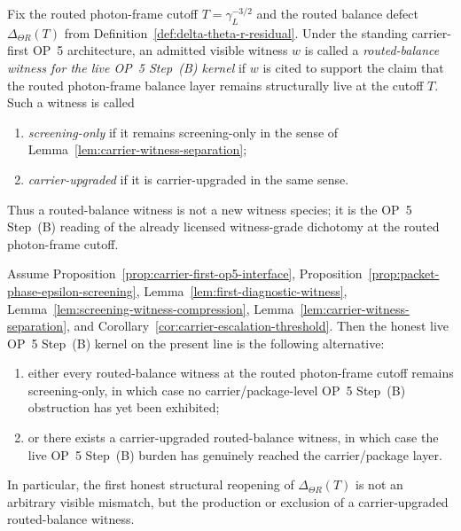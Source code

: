\begin{definition}
\label{def:routed-balance-witness-live-op5b-kernel}
Fix the routed photon-frame cutoff \(T=\gamma_L^{-3/2}\) and the routed balance defect \(\Delta_{\Theta R}(T)\) from Definition~\ref{def:delta-theta-r-residual}. Under the standing carrier-first OP~5 architecture, an admitted visible witness \(w\) is called a \emph{routed-balance witness for the live OP~5 Step~(B) kernel} if \(w\) is cited to support the claim that the routed photon-frame balance layer remains structurally live at the cutoff \(T\). Such a witness is called
\begin{enumerate}[leftmargin=2em]
  \item \emph{screening-only} if it remains screening-only in the sense of Lemma~\ref{lem:carrier-witness-separation};
  \item \emph{carrier-upgraded} if it is carrier-upgraded in the same sense.
\end{enumerate}
Thus a routed-balance witness is not a new witness species; it is the OP~5 Step~(B) reading of the already licensed witness-grade dichotomy at the routed photon-frame cutoff.
\end{definition}

\begin{proposition}
\label{prop:live-op5b-kernel-carrier-upgraded-witness-problem}
Assume Proposition~\ref{prop:carrier-first-op5-interface}, Proposition~\ref{prop:packet-phase-epsilon-screening}, Lemma~\ref{lem:first-diagnostic-witness}, Lemma~\ref{lem:screening-witness-compression}, Lemma~\ref{lem:carrier-witness-separation}, and Corollary~\ref{cor:carrier-escalation-threshold}. Then the honest live OP~5 Step~(B) kernel on the present line is the following alternative:
\begin{enumerate}[leftmargin=2em,label=(\roman*)]
  \item either every routed-balance witness at the routed photon-frame cutoff remains screening-only, in which case no carrier/package-level OP~5 Step~(B) obstruction has yet been exhibited;
  \item or there exists a carrier-upgraded routed-balance witness, in which case the live OP~5 Step~(B) burden has genuinely reached the carrier/package layer.
\end{enumerate}
In particular, the first honest structural reopening of \(\Delta_{\Theta R}(T)\) is not an arbitrary visible mismatch, but the production or exclusion of a carrier-upgraded routed-balance witness.
\end{proposition}

